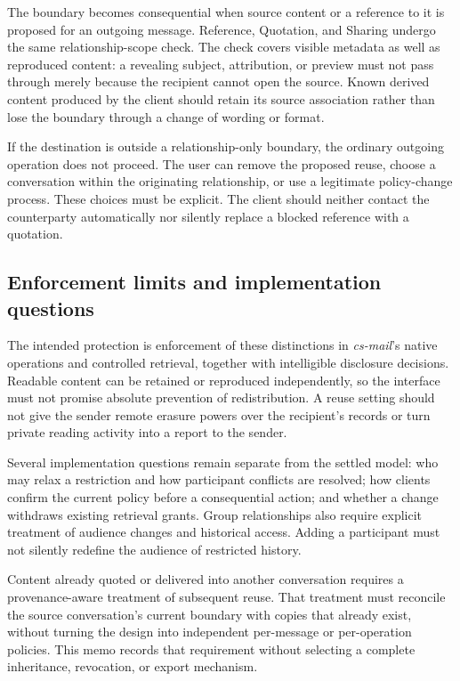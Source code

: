 \documentclass[11pt]{article}
\newcommand{\csmail}{\textit{cs-mail}}
\begin{document}
The boundary becomes consequential when source content or a reference to it is proposed for an outgoing message. Reference, Quotation, and Sharing undergo the same relationship-scope check. The check covers visible metadata as well as reproduced content: a revealing subject, attribution, or preview must not pass through merely because the recipient cannot open the source. Known derived content produced by the client should retain its source association rather than lose the boundary through a change of wording or format.

If the destination is outside a relationship-only boundary, the ordinary outgoing operation does not proceed. The user can remove the proposed reuse, choose a conversation within the originating relationship, or use a legitimate policy-change process. These choices must be explicit. The client should neither contact the counterparty automatically nor silently replace a blocked reference with a quotation.

\subsection{Enforcement limits and implementation questions}

The intended protection is enforcement of these distinctions in \csmail{}'s native operations and controlled retrieval, together with intelligible disclosure decisions. Readable content can be retained or reproduced independently, so the interface must not promise absolute prevention of redistribution. A reuse setting should not give the sender remote erasure powers over the recipient's records or turn private reading activity into a report to the sender.

Several implementation questions remain separate from the settled model: who may relax a restriction and how participant conflicts are resolved; how clients confirm the current policy before a consequential action; and whether a change withdraws existing retrieval grants. Group relationships also require explicit treatment of audience changes and historical access. Adding a participant must not silently redefine the audience of restricted history.

Content already quoted or delivered into another conversation requires a provenance-aware treatment of subsequent reuse. That treatment must reconcile the source conversation's current boundary with copies that already exist, without turning the design into independent per-message or per-operation policies. This memo records that requirement without selecting a complete inheritance, revocation, or export mechanism.
\end{document}
